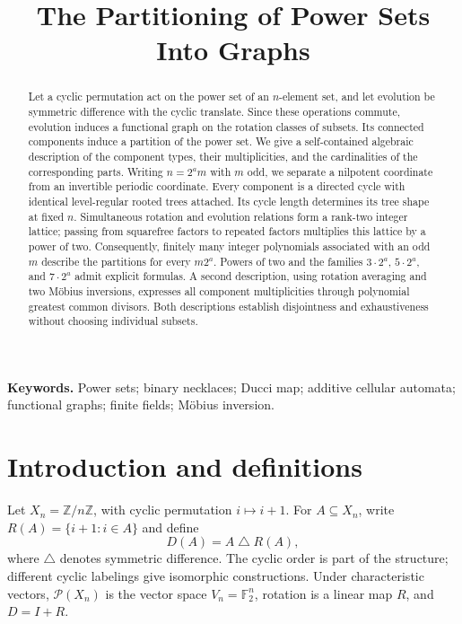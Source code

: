 \documentclass[11pt]{article}
\title{The Partitioning of Power Sets Into Graphs}
\author{}
\date{}
\theoremstyle{definition}
\theoremstyle{remark}
\numberwithin{equation}{section}
\newcommand{\F}{\mathbb F_2}
\newcommand{\Z}{\mathbb Z}
\begin{document}
\maketitle
\vspace{-2.5em}
\begin{abstract}
Let a cyclic permutation act on the power set of an $n$-element set, and let
evolution be symmetric difference with the cyclic translate. Since these
operations commute, evolution induces a functional graph on the rotation
classes of subsets. Its connected components induce a partition of the power
set. We give a self-contained algebraic description of the component types,
their multiplicities, and the cardinalities of the corresponding parts.
Writing $n=2^a m$ with $m$ odd, we separate a nilpotent coordinate from an
invertible periodic coordinate. Every component is a directed cycle with
identical level-regular rooted trees attached. Its cycle length determines
its tree shape at fixed $n$. Simultaneous rotation and evolution relations
form a rank-two integer lattice; passing from squarefree factors to repeated
factors multiplies this lattice by a power of two. Consequently, finitely many
integer polynomials associated with an odd $m$ describe the partitions for
every $m2^a$. Powers of two and the families $3\cdot2^a$, $5\cdot2^a$, and
$7\cdot2^a$ admit explicit formulas. A second description, using rotation
averaging and two M\"obius inversions, expresses all component multiplicities
through polynomial greatest common divisors. Both descriptions establish
disjointness and exhaustiveness without choosing individual subsets.
\end{abstract}

\noindent\textbf{Keywords.} Power sets; binary necklaces; Ducci map; additive
cellular automata; functional graphs; finite fields; M\"obius inversion.

\section{Introduction and definitions}\label{sec:introduction}

Let $X_n=\Z/n\Z$, with cyclic permutation $i\mapsto i+1$. For
$A\subseteq X_n$, write $R(A)=\{i+1:i\in A\}$ and define
\begin{equation}\label{eq:set-map}
 D(A)=A\mathbin{\triangle}R(A),
\end{equation}
where $\triangle$ denotes symmetric difference. The cyclic order is part of
the structure; different cyclic labelings give isomorphic constructions.
Under characteristic vectors, $\mathcal P(X_n)$ is the vector
space $V_n=\F^n$, rotation is a linear map $R$, and $D=I+R$.
\end{document}
